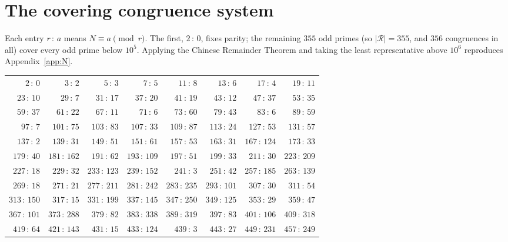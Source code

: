 \documentclass[11pt]{article}
\theoremstyle{plain}
\theoremstyle{definition}
\theoremstyle{remark}
\newcommand{\N}{N}
\begin{document}
\section{The covering congruence system}\label{app:res}
Each entry $r\,{:}\,a$ means $\N\equiv a\pmod r$. The first, $2\,{:}\,0$, fixes
parity; the remaining $355$ odd primes (so $|\mathcal R|=355$, and $356$
congruences in all) cover every odd prime below $10^{5}$. Applying the Chinese
Remainder Theorem and taking the least representative above $10^{6}$ reproduces
Appendix~\ref{app:N}.
\begin{center}\scriptsize
\setlength{\tabcolsep}{4pt}
\begin{tabular}{rrrrrrrr}
\toprule
$2\,{:}\,0$ & $3\,{:}\,2$ & $5\,{:}\,3$ & $7\,{:}\,5$ & $11\,{:}\,8$ & $13\,{:}\,6$ & $17\,{:}\,4$ & $19\,{:}\,11$ \\
$23\,{:}\,10$ & $29\,{:}\,7$ & $31\,{:}\,17$ & $37\,{:}\,20$ & $41\,{:}\,19$ & $43\,{:}\,12$ & $47\,{:}\,37$ & $53\,{:}\,35$ \\
$59\,{:}\,37$ & $61\,{:}\,22$ & $67\,{:}\,11$ & $71\,{:}\,6$ & $73\,{:}\,60$ & $79\,{:}\,43$ & $83\,{:}\,6$ & $89\,{:}\,59$ \\
$97\,{:}\,7$ & $101\,{:}\,75$ & $103\,{:}\,83$ & $107\,{:}\,33$ & $109\,{:}\,87$ & $113\,{:}\,24$ & $127\,{:}\,53$ & $131\,{:}\,57$ \\
$137\,{:}\,2$ & $139\,{:}\,31$ & $149\,{:}\,51$ & $151\,{:}\,61$ & $157\,{:}\,53$ & $163\,{:}\,31$ & $167\,{:}\,124$ & $173\,{:}\,33$ \\
$179\,{:}\,40$ & $181\,{:}\,162$ & $191\,{:}\,62$ & $193\,{:}\,109$ & $197\,{:}\,51$ & $199\,{:}\,33$ & $211\,{:}\,30$ & $223\,{:}\,209$ \\
$227\,{:}\,18$ & $229\,{:}\,32$ & $233\,{:}\,123$ & $239\,{:}\,152$ & $241\,{:}\,3$ & $251\,{:}\,42$ & $257\,{:}\,185$ & $263\,{:}\,139$ \\
$269\,{:}\,18$ & $271\,{:}\,21$ & $277\,{:}\,211$ & $281\,{:}\,242$ & $283\,{:}\,235$ & $293\,{:}\,101$ & $307\,{:}\,30$ & $311\,{:}\,54$ \\
$313\,{:}\,150$ & $317\,{:}\,15$ & $331\,{:}\,199$ & $337\,{:}\,145$ & $347\,{:}\,250$ & $349\,{:}\,125$ & $353\,{:}\,29$ & $359\,{:}\,47$ \\
$367\,{:}\,101$ & $373\,{:}\,288$ & $379\,{:}\,82$ & $383\,{:}\,338$ & $389\,{:}\,319$ & $397\,{:}\,83$ & $401\,{:}\,106$ & $409\,{:}\,318$ \\
$419\,{:}\,64$ & $421\,{:}\,143$ & $431\,{:}\,15$ & $433\,{:}\,124$ & $439\,{:}\,3$ & $443\,{:}\,27$ & $449\,{:}\,231$ & $457\,{:}\,249$ \\

\end{tabular}
\end{center}
\end{document}
